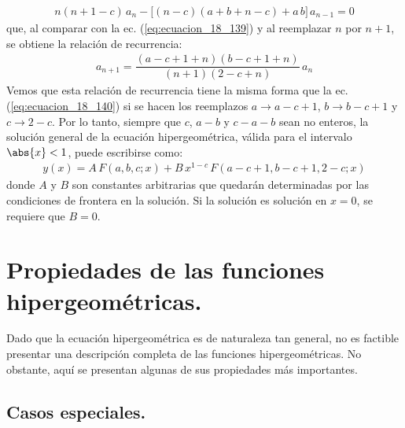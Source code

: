 \begin{align*}
n(n + 1 - c) \, a_{n} - \big[ (n - c)(a + b + n - c) + a \, b \big] \, a_{n-1} = 0
\end{align*}
que, al comparar con la ec. (\ref{eq:ecuacion_18_139}) y al reemplazar $n$ por $n + 1$, se obtiene la relación de recurrencia:
\begin{align*}
a_{n+1} = \dfrac{(a - c + 1 + n)(b -c + 1 + n)}{(n + 1)(2 - c + n)} \, a_{n}
\end{align*}
Vemos que esta relación de recurrencia tiene la misma forma que la ec. (\ref{eq:ecuacion_18_140}) si se hacen los reemplazos $a \to a - c + 1$, $b \to b - c + 1$ y $c \to 2 - c$. Por lo tanto, siempre que $c$, $a - b$ y $c - a - b$ sean no enteros, la solución general de la ecuación hipergeométrica, válida para el intervalo $\abs{x} < 1$, puede escribirse como:
\begin{align}
y(x) = A \, F(a, b, c; x) + B \, x^{1-c} \, F(a-c+1, b - c + 1, 2 - c; x)
\label{eq:ecuacion_18_143}
\end{align}
donde $A$ y $B$ son constantes arbitrarias que quedarán determinadas por las condiciones de frontera en la solución. Si la solución es solución en $x = 0$, se requiere que $B = 0$.

\section{Propiedades de las funciones hipergeométricas.}

Dado que la ecuación hipergeométrica es de naturaleza tan general, no es factible presentar una descripción completa de las funciones hipergeométricas. No obstante, aquí se presentan algunas de sus propiedades más importantes.

\subsection{Casos especiales.}

